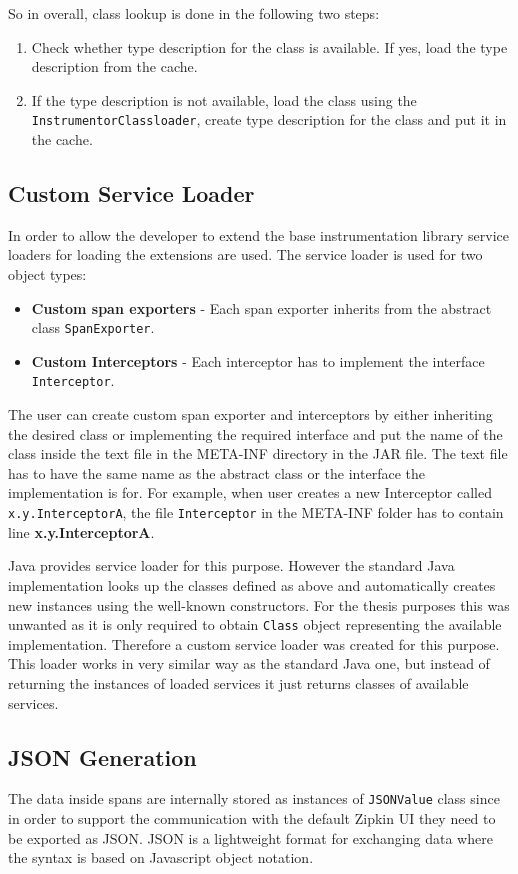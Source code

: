 So in overall, class lookup is done in the following two steps:
\begin{enumerate}
	\item Check whether type description for the class is available. If yes, load the type description from the cache.
	\item If the type description is not available, load the class using the \newline \texttt{InstrumentorClassloader}, create type description for the class and put it in the cache.
\end{enumerate}

\subsection{Custom Service Loader}
In order to allow the developer to extend the base instrumentation library service loaders for loading the extensions are used. The service loader is used for two object types: 
\begin{itemize}
	\item \textbf{Custom span exporters} - Each span exporter inherits from the abstract class \texttt{SpanExporter}.
	\item \textbf{Custom Interceptors} - Each interceptor has to implement the interface \texttt{Interceptor}.
\end{itemize} 
The user can create custom span exporter and interceptors by either inheriting the desired class or implementing the required interface and put the name of the class inside the text file in the META-INF directory in the JAR file. The text file has to have the same name as the abstract class or the interface the implementation is for. For example, when user creates a new Interceptor called \texttt{x.y.InterceptorA}, the file \texttt{Interceptor} in the META-INF folder has to contain line \textbf{x.y.InterceptorA}.

Java provides service loader for this purpose. However the standard Java implementation looks up the classes defined as above and automatically creates new instances using the well-known constructors. For the thesis purposes this was unwanted as it is only required to obtain \texttt{Class} object representing the available implementation. Therefore a custom service loader was created for this purpose. This loader works in very similar way as the standard Java one, but instead of returning the instances of loaded services it just returns classes of available services. 

\subsection{JSON Generation}
The data inside spans are internally stored as instances of \texttt{JSONValue} class since in order to support the communication with the default Zipkin UI they need to be exported as JSON. JSON is a lightweight format for exchanging data where the syntax is based on Javascript object notation.

